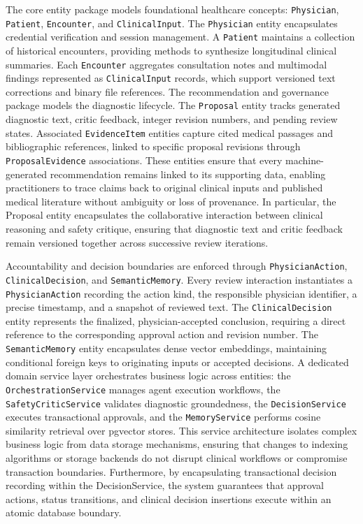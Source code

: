 The core entity package models foundational healthcare concepts: \texttt{Physician}, \texttt{Patient}, \texttt{Encounter}, and \texttt{ClinicalInput}. The \texttt{Physician} entity encapsulates credential verification and session management. A \texttt{Patient} maintains a collection of historical encounters, providing methods to synthesize longitudinal clinical summaries. Each \texttt{Encounter} aggregates consultation notes and multimodal findings represented as \texttt{ClinicalInput} records, which support versioned text corrections and binary file references. The recommendation and governance package models the diagnostic lifecycle. The \texttt{Proposal} entity tracks generated diagnostic text, critic feedback, integer revision numbers, and pending review states. Associated \texttt{EvidenceItem} entities capture cited medical passages and bibliographic references, linked to specific proposal revisions through \texttt{ProposalEvidence} associations. These entities ensure that every machine-generated recommendation remains linked to its supporting data, enabling practitioners to trace claims back to original clinical inputs and published medical literature without ambiguity or loss of provenance. In particular, the Proposal entity encapsulates the collaborative interaction between clinical reasoning and safety critique, ensuring that diagnostic text and critic feedback remain versioned together across successive review iterations.

Accountability and decision boundaries are enforced through \texttt{PhysicianAction}, \texttt{ClinicalDecision}, and \texttt{SemanticMemory}. Every review interaction instantiates a \texttt{PhysicianAction} recording the action kind, the responsible physician identifier, a precise timestamp, and a snapshot of reviewed text. The \texttt{ClinicalDecision} entity represents the finalized, physician-accepted conclusion, requiring a direct reference to the corresponding approval action and revision number. The \texttt{SemanticMemory} entity encapsulates dense vector embeddings, maintaining conditional foreign keys to originating inputs or accepted decisions. A dedicated domain service layer orchestrates business logic across entities: the \texttt{OrchestrationService} manages agent execution workflows, the \texttt{SafetyCriticService} validates diagnostic groundedness, the \texttt{DecisionService} executes transactional approvals, and the \texttt{MemoryService} performs cosine similarity retrieval over pgvector stores. This service architecture isolates complex business logic from data storage mechanisms, ensuring that changes to indexing algorithms or storage backends do not disrupt clinical workflows or compromise transaction boundaries. Furthermore, by encapsulating transactional decision recording within the DecisionService, the system guarantees that approval actions, status transitions, and clinical decision insertions execute within an atomic database boundary.


